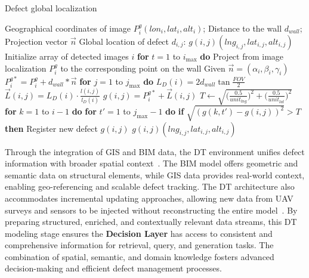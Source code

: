 \documentclass[a4paper,fleqn]{cas-sc}
\begin{document}
\begin{algorithm}[t!]
\caption{Defect global localization}
\label{al:1}
\begin{algorithmic}[1]
\REQUIRE Geographical coordinates of image $P_{i}^{g}(lon_{i}, lat_{i}, alt_{i})$; Distance to the wall $d_{wall}$; Projection vector $\vec{n}$
\ENSURE Global location of defect $d_{i,j}$: $g(i,j)(lng_{i,j}, lat_{i,j}, alt_{i,j})$
\STATE Initialize array of detected images $i$
\STATE \textbf{for} $t = 1$ to $i_{\max}$ \textbf{do}
\STATE \hspace{1em}Project from image localization $P_{i}^{g}$ to the corresponding point on the wall
\STATE \hspace{1em}Given $\vec{n} = (\alpha_{i}, \beta_{i}, \gamma_{i})$
\STATE \hspace{1em}$P^{g\ast}_{i} = P^{g}_{i} + d_{wall} * \vec{n}$
\STATE \hspace{1em}\textbf{for} $j = 1$ to $j_{\max}$ \textbf{do}
\STATE \hspace{2em}$L_{D}(i) = 2d_{wall} \tan{\frac{FOV}{2}}$
\STATE \hspace{2em}$\vec{L}(i,j) = L_{D}(i) \cdot \frac{l(i,j)}{l_{D}(i)}$
\STATE \hspace{2em}$g(i,j) = P^{g\ast}_{i} + \vec{L}(i,j)$
\STATE \hspace{2em}$T \gets \sqrt{ \bigl(\tfrac{0.5}{unit_{lng}}\bigr)^2 + \bigl(\tfrac{0.5}{unit_{lat}}\bigr)^2 }$
\STATE \hspace{2em}\textbf{for} $k = 1$ to $i-1$ \textbf{do}
\STATE \hspace{3em}\textbf{for} $t' = 1$ to $j_{\max}-1$ \textbf{do}
\STATE \hspace{4em}\textbf{if} $\sqrt{(g(k,t') - g(i,j))^2} > T$ \textbf{then}
\STATE \hspace{5em}Register new defect $g(i,j)$
\RETURN $g(i,j)(lng_{i,j}, lat_{i,j}, alt_{i,j})$
\end{algorithmic}
\end{algorithm}

Through the integration of GIS and BIM data, the DT environment unifies defect information with broader spatial context~\cite{chen2023gis}. The BIM model offers geometric and semantic data on structural elements, while GIS data provides real-world context, enabling geo-referencing and scalable defect tracking. The DT architecture also accommodates incremental updating approaches, allowing new data from UAV surveys and sensors to be injected without reconstructing the entire model~\cite{zhang2024automated}. By preparing structured, enriched, and contextually relevant data streams, this DT modeling stage ensures the \textbf{Decision Layer} has access to consistent and comprehensive information for retrieval, query, and generation tasks. The combination of spatial, semantic, and domain knowledge fosters advanced decision-making and efficient defect management processes.
\end{document}
